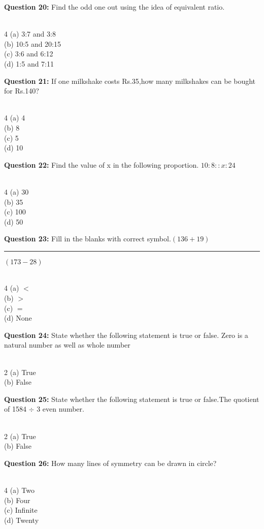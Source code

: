 \documentclass[12pt, a4paper]{article}
\newcommand{\mcqtwotwo}[9]{
\vspace{2.5mm}
\begin{raggedright}
\textbf{Question #1:} #2 \hfill \textit{#7}\\
\textit{#8}\\
#9
\begin{multicols}{2}{}
(a) #3\\
\columnbreak
(b) #4\\

\end{multicols}
\end{raggedright}}
\newcommand{\mcqfourfour}[9]{
\vspace{2.5mm}
\begin{raggedright}
\textbf{Question #1:} #2 \hfill \textit{#7}\\
\textit{#8}\\
#9
\begin{multicols}{4}{}
(a) #3\\
\columnbreak
(b) #4\\
\columnbreak
(c) #5\\
\columnbreak
(d) #6\\
\end{multicols}
\end{raggedright}}
\newcommand{\mcqfourfour}[9]{
\vspace{1.5mm}
\begin{raggedright}
\textbf{Question #1:} #2 \hfill \textit{#7}\\
\textit{#8}\\
#9
\begin{multicols}{4}{}
\begin{enumerate}
\item(a) #3\\
\columnbreak
\item(b) #4\\
\columnbreak
\item(c) #5\\
\columnbreak
\item(d) #6\\
\ewn{enumerate}
\end{multicols}
\end{raggedright}}
\begin{document}
\mcqfourfour{20}{Find the odd one out using the idea of equivalent ratio.}
{3:7 and 3:8}
{10:5 and 20:15}
{3:6 and 6:12}
{1:5 and 7:11}
{ }{}{}


\mcqfourfour{21}{If one milkshake costs Rs.35,how many milkshakes can be bought for Rs.140?}
{4}
{8}
{5}
{10}
{ }{}{}


\mcqfourfour{22}{Find the value of x in the following proportion.                                                $10: 8:: x: 24$}
{30}
{35}
{100}
{50}
{ }{}{}


\mcqfourfour{23}{Fill in the blanks with correct symbol.$(136+19)$ \rule{60pt}{0.5pt} $(173-28)$}
{$<$}
{$>$}
{$=$}
{None}
{ }{}{}



\mcqtwotwo{24}{State whether the following statement is true or false.
        Zero is a natural number as well as whole number}
{True}
{False}
{}
{}
{ }{}{}


\mcqtwotwo{25}{State whether the following statement is true or false.The quotient of 1584 $\div$ 3 even number.}
{True}
{False}
{}
{}
{ }{}{}


\mcqfourfour{26}{How many lines of symmetry can be drawn in circle?}
{Two}
{Four}
{Infinite}
{Twenty }
{ }{}{}

\end{document}
